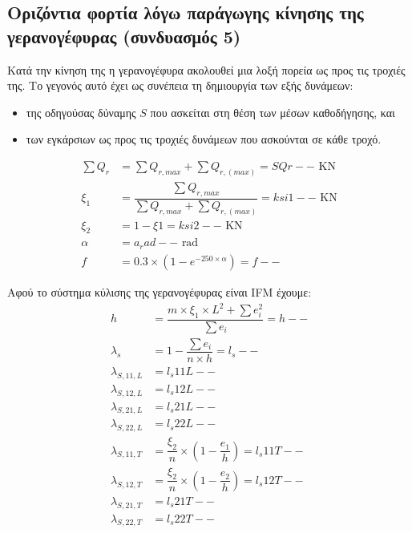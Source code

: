 
\subsection{Οριζόντια φορτία λόγω παράγωγης κίνησης της γερανογέφυρας (συνδυασμός 5)}
Κατά την κίνηση της η γερανογέφυρα ακολουθεί μια λοξή πορεία ως προς τις τροχιές της. Το γεγονός αυτό έχει ως συνέπεια τη δημιουργία των εξής δυνάμεων:
\begin{itemize} 
\item της οδηγούσας δύναμης $S$ που ασκείται στη θέση των μέσων καθοδήγησης, και
\item των εγκάρσιων ως προς τις τροχιές δυνάμεων που ασκούνται σε κάθε τροχό.
\end{itemize}

\begin{align*}\sum{Q_r} &= \displaystyle\sum{Q_{r,max}} + \displaystyle\sum{Q_{r,(max)}} = SQr-- \text{ KN} \\ 
\xi_1    &= \dfrac{\displaystyle\sum{Q_{r,max}}}{\displaystyle\sum{Q_{r,max}} + \displaystyle\sum{Q_{r,(max)}}} = ksi1-- \text{ KN} \\ 
\xi_2    &= 1 - \xi1 = ksi2-- \text{ KN} \\ 
\alpha    &= a_rad-- \text{ rad} \\ 
f         &= 0.3 \times \left(1 - e^{-250 \times \alpha}\right) = f--
\end{align*}

Αφού το σύστημα κύλισης της γερανογέφυρας είναι IFM έχουμε:
\begin{align*}
h                &= \dfrac{m \times \xi_1 \times L^2 + \sum{e_i^2}}{\sum{e_i}} = h-- \\ 
\lambda_s        &= 1 - \dfrac{\sum{e_i}}{n \times h} =  l_s-- \\ 
\lambda_{S,11,L} &= l_s11L-- \\ 
\lambda_{S,12,L} &= l_s12L-- \\ 
\lambda_{S,21,L} &= l_s21L-- \\ 
\lambda_{S,22,L} &= l_s22L-- \\ 
\lambda_{S,11,T} &= \dfrac{\xi_2}{n} \times \left(1 - \dfrac{e_1}{h}\right) = l_s11T-- \\ 
\lambda_{S,12,T} &= \dfrac{\xi_2}{n} \times \left(1 - \dfrac{e_2}{h}\right) = l_s12T-- \\ 
\lambda_{S,21,T} &= l_s21T-- \\ 
\lambda_{S,22,T} &= l_s22T--
\end{align*}

